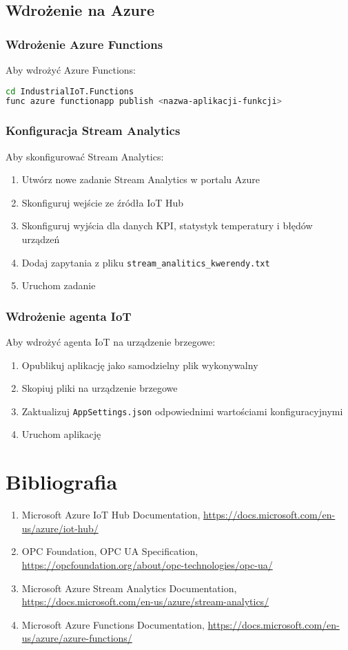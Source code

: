 \documentclass{article}
\begin{document}
\subsection{Wdrożenie na Azure}
\subsubsection{Wdrożenie Azure Functions}
Aby wdrożyć Azure Functions:
\begin{lstlisting}[language=bash]
cd IndustrialIoT.Functions
func azure functionapp publish <nazwa-aplikacji-funkcji>
\end{lstlisting}

\subsubsection{Konfiguracja Stream Analytics}
Aby skonfigurować Stream Analytics:
\begin{enumerate}
    \item Utwórz nowe zadanie Stream Analytics w portalu Azure
    \item Skonfiguruj wejście ze źródła IoT Hub
    \item Skonfiguruj wyjścia dla danych KPI, statystyk temperatury i błędów urządzeń
    \item Dodaj zapytania z pliku \texttt{stream\_analitics\_kwerendy.txt}
    \item Uruchom zadanie
\end{enumerate}

\subsubsection{Wdrożenie agenta IoT}
Aby wdrożyć agenta IoT na urządzenie brzegowe:
\begin{enumerate}
    \item Opublikuj aplikację jako samodzielny plik wykonywalny
    \item Skopiuj pliki na urządzenie brzegowe
    \item Zaktualizuj \texttt{AppSettings.json} odpowiednimi wartościami konfiguracyjnymi
    \item Uruchom aplikację
\end{enumerate}

\section{Bibliografia}
\begin{enumerate}
    \item Microsoft Azure IoT Hub Documentation, \url{https://docs.microsoft.com/en-us/azure/iot-hub/}
    \item OPC Foundation, OPC UA Specification, \url{https://opcfoundation.org/about/opc-technologies/opc-ua/}
    \item Microsoft Azure Stream Analytics Documentation, \url{https://docs.microsoft.com/en-us/azure/stream-analytics/}
    \item Microsoft Azure Functions Documentation, \url{https://docs.microsoft.com/en-us/azure/azure-functions/}
\end{enumerate}
\end{document}
